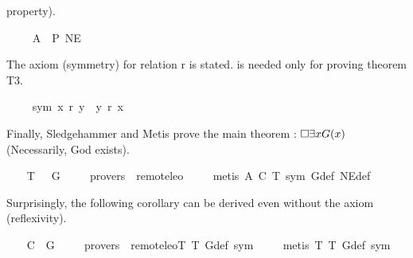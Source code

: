 \begin{isabellebody}
\begin{isamarkuptext}
property).%
\end{isamarkuptext}%
\isamarkuptrue%
\ \ \isamarkupfalse%
\ \ A{}{\isacharcolon}\ \ {\isachardoublequoteopen}{\isacharbrackleft}P\ NE{\isacharbrackright}{\isachardoublequoteclose}%
\begin{isamarkuptext}%
The  axiom (symmetry) for relation r is stated.  is needed only 
for proving theorem T3.%
\end{isamarkuptext}%
\isamarkuptrue%
\ \ \isamarkupfalse%
\ \ sym{\isacharcolon}\ {\isachardoublequoteopen}x\ r\ y\ {\isasymlongrightarrow}\ y\ r\ x{\isachardoublequoteclose}%
\begin{isamarkuptext}%
Finally, Sledgehammer and Metis prove the main theorem : $\Box \exists x G(x)$ \\
(Necessarily, God exists).%
\end{isamarkuptext}%
\isamarkuptrue%
\ \ \isamarkupfalse%
\ T{}{\isacharcolon}\ {\isachardoublequoteopen}{\isacharbrackleft}{\isasymbox}\ {\isacharparenleft}{\isasymexists}\ G{\isacharparenright}{\isacharbrackright}{\isachardoublequoteclose}\ \isanewline
\ \ \isamarkupfalse%
\ {\isacharbrackleft}provers\ {\isacharequal}\ remote{\isacharunderscore}leo{}{\isacharbrackright}\ \isanewline
%
\isadelimproof
\ \ %
\endisadelimproof
%
\isatagproof
{}\isamarkupfalse%
\ {\isacharparenleft}metis\ A{}\ C\ T{}\ sym\ G{\isacharunderscore}def\ NE{\isacharunderscore}def{\isacharparenright}%
\endisatagproof
{\isafoldproof}%
%
\isadelimproof
%
\endisadelimproof
%
\begin{isamarkuptext}%
Surprisingly, the following corollary can be derived even without the  axiom (reflexivity).%
\end{isamarkuptext}%
\isamarkuptrue%
\ \ \isamarkupfalse%
\ C{}{\isacharcolon}\ {\isachardoublequoteopen}{\isacharbrackleft}{\isasymexists}\ G{\isacharbrackright}{\isachardoublequoteclose}\ \isanewline
\ \ \isamarkupfalse%
\ {\isacharbrackleft}provers\ {\isacharequal}\ remote{\isacharunderscore}leo{}{\isacharbrackright}{\isacharparenleft}T{}\ T{}\ G{\isacharunderscore}def\ sym{\isacharparenright}\ \isanewline
%
\isadelimproof
\ \ %
\endisadelimproof
%
\isatagproof
{}\isamarkupfalse%
\ {\isacharparenleft}metis\ T{}\ T{}\ G{\isacharunderscore}def\ sym{\isacharparenright}%

\end{isabellebody}
